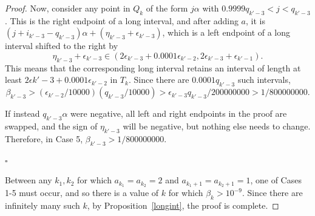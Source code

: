 \documentclass[10pt,a4paper]{amsart}
\begin{document}
\begin{proof}

Now, consider any point in $Q_k$ of the form $j \alpha$ with $0.9999 q_{k'-3} < j < q_{k'-3}$. This is the right endpoint of a long interval, and after adding $a$, it is $(j + i_{k'-3} - q_{k'-3})\alpha + (\eta_{k'-3} + \epsilon_{k'-3})$, which is a left endpoint of a long interval shifted to the right by 
\[
\eta_{k'-3} + \epsilon_{k'-3} \in (2 \epsilon_{k'-3} + 0.0001\epsilon_{k'-2}, 2\epsilon_{k'-3} + \epsilon_{k'-1}).
\] 
This means that the corresponding long interval retains an interval of length at least $2\epsilon{k'-3} + 0.0001 \epsilon_{k'-2}$ in $T_k$. Since there are $0.0001 q_{k'-3}$ such intervals,
\[
\beta_{k'-3} > (\epsilon_{k'-2}/10000)(q_{k'-3}/10000) > \epsilon_{k'-3}q_{k'-3}/200000000 > 1/800000000.
\]

If instead $q_{k'-3} \alpha$ were negative, all left and right endpoints in the proof are swapped, and the sign of $\eta_{k'-3}$ will be negative, but nothing else needs to change. Therefore, in Case 5, $\beta_{k'-3} > 1/800000000$.
\begin{flushright}
    $\square$\\
\end{flushright}

Between any $k_1, k_2$ for which $a_{k_1} = a_{k_2} = 2$ and $a_{k_1 + 1} = a_{k_2 + 1} = 1$, one of Cases 1-5 must occur, and so there is a value of $k$ for which $\beta_k > 10^{-9}$. Since there are infinitely many such $k$, by Proposition~\ref{longint}, the proof is complete.

\end{proof}
\end{document}
